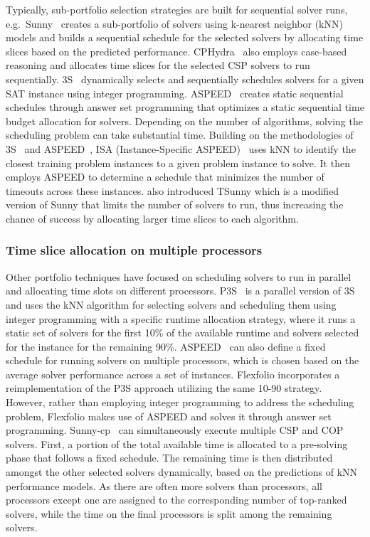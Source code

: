Typically, sub-portfolio selection strategies are built for sequential solver runs, e.g.\ Sunny~\cite{sunny} creates a sub-portfolio of solvers using k-nearest neighbor (kNN) models and builds a sequential schedule for the selected solvers by allocating time slices based on the predicted performance. CPHydra~\cite{cphydra} also employs case-based reasoning and allocates time slices for the selected CSP solvers to run sequentially. 3S~\cite{3s} dynamically selects and sequentially schedules solvers for a given SAT instance using integer programming. ASPEED~\cite{aspeed} creates static sequential schedules through answer set programming that optimizes a static sequential time budget allocation for solvers. Depending on the number of algorithms, solving the scheduling problem can take substantial time. Building on the methodologies of 3S~\cite{3s} and ASPEED~\cite{aspeed}, ISA (Instance-Specific ASPEED)~\cite{flexfolio} uses kNN to identify the closest training problem instances to a given problem instance to solve. It then employs ASPEED to determine a schedule that minimizes the number of timeouts across these instances. \cite{flexfolio} also introduced TSunny which is a modified version of Sunny that limits the number of solvers to run, thus increasing the chance of success by allocating larger time slices to each algorithm.

\subsubsection{Time slice allocation on multiple processors}

Other portfolio techniques have focused on scheduling solvers to run in parallel and allocating time slots on different processors. P3S~\cite{p3s} is a parallel version of 3S and uses the kNN algorithm for selecting solvers and scheduling them using integer programming with a specific runtime allocation strategy, where it runs a static set of solvers for the first 10\% of the available runtime and solvers selected for the instance for the remaining 90\%. ASPEED~\cite{aspeed} can also define a fixed schedule for running solvers on multiple processors, which is chosen based on the average solver performance across a set of instances. Flexfolio \cite{flexfolio} incorporates a reimplementation of the P3S approach utilizing the same 10-90 strategy. However, rather than employing integer programming to address the scheduling problem, Flexfolio makes use of ASPEED and solves it through answer set programming. Sunny-cp~\cite{sunnycp2} can simultaneously execute multiple CSP and COP solvers. First, a portion of the total available time is allocated to a pre-solving phase that follows a fixed schedule. The remaining time is then distributed amongst the other selected solvers dynamically, based on the predictions of kNN performance models. As there are often more solvers than processors, all processors except one are assigned to the corresponding number of top-ranked solvers, while the time on the final processors is split among the remaining solvers.

